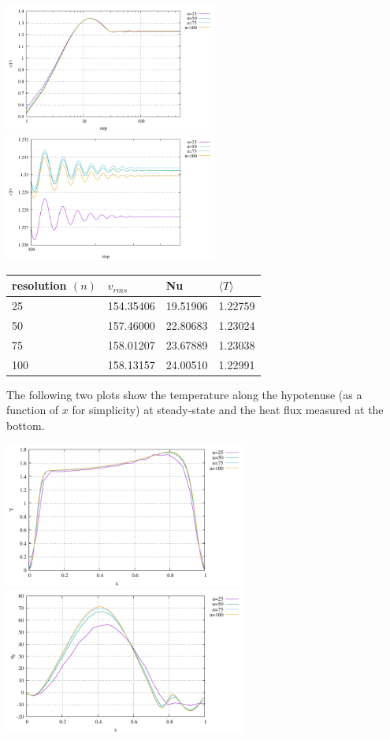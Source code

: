 \begin{center}
\includegraphics[width=7cm]{python_codes/fieldstone_51/images/avrgT_res.pdf}
\includegraphics[width=7cm]{python_codes/fieldstone_51/images/avrgT_res_zoom.pdf}\\
\end{center}

\begin{center}
\begin{tabular}{llll}
\hline
resolution $(n)$ & $v_{rms}$ & Nu & $\langle T \rangle$ \\
\hline
\hline
25  & 154.35406 & 19.51906 &  1.22759\\
50  & 157.46000 & 22.80683 &  1.23024\\
75  & 158.01207 & 23.67889 &  1.23038\\
100 & 158.13157 & 24.00510 &  1.22991\\
\hline
\end{tabular}
\end{center}

The following two plots show the temperature along the hypotenuse (as a function of $x$
for simplicity) at steady-state and the heat flux measured at the bottom. 
\begin{center}
\includegraphics[width=8cm]{python_codes/fieldstone_51/images/temp_hyp_res.pdf}
\includegraphics[width=8cm]{python_codes/fieldstone_51/images/qy_bot_res.pdf}
\end{center}

